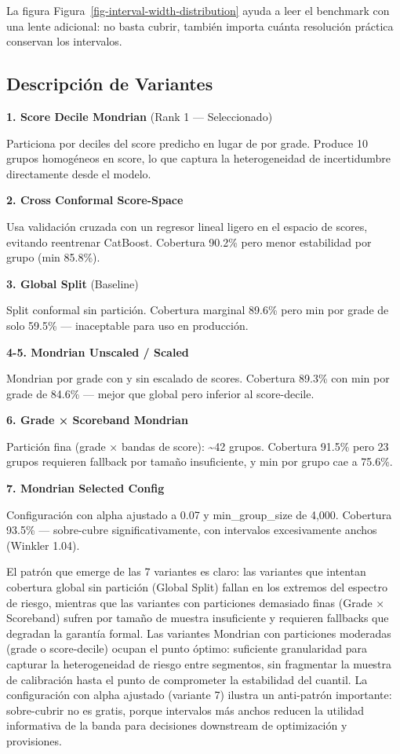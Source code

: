 \documentclass[
  spanish,
  11pt,
  letterpaper,
]{scrbook}
\theoremstyle{plain}
\theoremstyle{remark}
\begin{document}
La figura Figura~\ref{fig-interval-width-distribution} ayuda a leer el
benchmark con una lente adicional: no basta cubrir, también importa
cuánta resolución práctica conservan los intervalos.

\subsection{Descripción de Variantes}\label{descripciuxf3n-de-variantes}

\textbf{1. Score Decile Mondrian} (Rank 1 --- Seleccionado)

Particiona por deciles del score predicho en lugar de por grade. Produce
10 grupos homogéneos en score, lo que captura la heterogeneidad de
incertidumbre directamente desde el modelo.

\textbf{2. Cross Conformal Score-Space}

Usa validación cruzada con un regresor lineal ligero en el espacio de
scores, evitando reentrenar CatBoost. Cobertura 90.2\% pero menor
estabilidad por grupo (min 85.8\%).

\textbf{3. Global Split} (Baseline)

Split conformal sin partición. Cobertura marginal 89.6\% pero min por
grade de solo 59.5\% --- inaceptable para uso en producción.

\textbf{4-5. Mondrian Unscaled / Scaled}

Mondrian por grade con y sin escalado de scores. Cobertura 89.3\% con
min por grade de 84.6\% --- mejor que global pero inferior al
score-decile.

\textbf{6. Grade × Scoreband Mondrian}

Partición fina (grade × bandas de score): \textasciitilde42 grupos.
Cobertura 91.5\% pero 23 grupos requieren fallback por tamaño
insuficiente, y min por grupo cae a 75.6\%.

\textbf{7. Mondrian Selected Config}

Configuración con alpha ajustado a 0.07 y min\_group\_size de 4,000.
Cobertura 93.5\% --- sobre-cubre significativamente, con intervalos
excesivamente anchos (Winkler 1.04).

El patrón que emerge de las 7 variantes es claro: las variantes que
intentan cobertura global sin partición (Global Split) fallan en los
extremos del espectro de riesgo, mientras que las variantes con
particiones demasiado finas (Grade × Scoreband) sufren por tamaño de
muestra insuficiente y requieren fallbacks que degradan la garantía
formal. Las variantes Mondrian con particiones moderadas (grade o
score-decile) ocupan el punto óptimo: suficiente granularidad para
capturar la heterogeneidad de riesgo entre segmentos, sin fragmentar la
muestra de calibración hasta el punto de comprometer la estabilidad del
cuantil. La configuración con alpha ajustado (variante 7) ilustra un
anti-patrón importante: sobre-cubrir no es gratis, porque intervalos más
anchos reducen la utilidad informativa de la banda para decisiones
downstream de optimización y provisiones.
\end{document}
